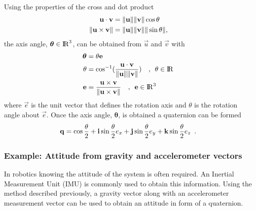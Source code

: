 Using the properties of the cross and dot product
%
\begin{align}
  {\mathbf{u}} \cdot {\mathbf{v}} &=
    {\|{\mathbf{u}}\|} {\|{\mathbf{v}}\|} \cos \theta \\
  {\|{\mathbf{u}} \times {\mathbf{v}}\|} &=
    {\|{\mathbf{u}}\|} {\|{\mathbf{v}}\|} {\|\sin \theta\|} ,
\end{align}
%
the axis angle, $\boldsymbol{\theta} \in {\rm I\!R}^{3}$, can be obtained from
$\Vec{u}$ and $\Vec{v}$ with
%
\begin{align}
  \boldsymbol{\theta} &= \theta {\mathbf{e}} \\
  \label{eq:angle_axis_calc_angle}
  \theta &= \cos^{-1}(
    \dfrac{{\mathbf{u}} \cdot {\mathbf{v}}}
          {{\|{\mathbf{u}}\|} {\|{\mathbf{v}}\|}}
  ) \quad , \enspace \theta \in {\rm I\!R} \\
  \label{eq:angle_axis_calc_axis}
  {\mathbf{e}} &=
    \dfrac{{\mathbf{u}} \times {\mathbf{v}}}{{\|{\mathbf{u}} \times {\mathbf{v}}\|}}
    \quad , \enspace {\mathbf{e}} \in {\rm I\!R}^{3}
\end{align}
%
where $\Vec{e}$ is the unit vector that defines the rotation axis and $\theta$
is the rotation angle about $\Vec{e}$. Once the axis angle,
$\boldsymbol{\theta}$, is obtained a quaternion can be formed
%
\begin{equation}
  \label{eq:quaternion_from_axis_angles}
  {{\mathbf{q}}} =
    \cos \dfrac{\theta}{2}
    + {\mathbf{i}} \sin \dfrac{\theta}{2} e_{x}
    + {\mathbf{j}} \sin \dfrac{\theta}{2} e_{y}
    + {\mathbf{k}} \sin \dfrac{\theta}{2} e_{z} \enspace .
\end{equation}


\subsubsection{Example: Attitude from gravity and accelerometer vectors}

In robotics knowing the attitude of the system is often required. An Inertial
Measurement Unit (IMU) is commonly used to obtain this information. Using the
method described previously, a gravity vector along with an accelerometer
measurement vector can be used to obtain an attitude in form of a quaternion.

